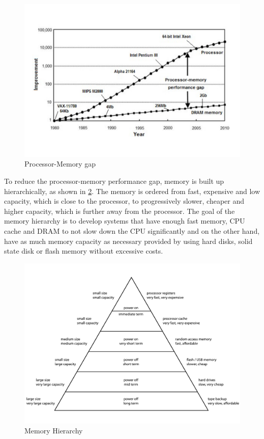 \documentclass[
	12pt,
	a4paper,
	abstract,
	bibliography=totoc,
	chapterprefix,
	headings=openright,
	numbers=endperiod,
	parskip=half,
	twoside,
]{scrreprt}
\begin{document}
\begin{figure}[ht]
	\centering
	\includegraphics[scale=0.45]{processor_memory_gap.pdf}
	\caption{Processor-Memory gap \cite{cpu-mem-gap}}
		\label{fig:processor memory gap}
\end{figure}


To reduce the processor-memory performance gap, memory is built up hierarchically, as shown in \cref{fig:memory hierarchy}.
The memory is ordered from fast, expensive and low capacity, which is close to the processor, to progressively slower, cheaper and higher capacity, which is further away from the processor.
The goal of the memory hierarchy is to develop systems that have enough fast memory, CPU cache and DRAM to not slow down the CPU significantly and on the other hand, have as much memory capacity as necessary provided by using hard disks, solid state disk or flash memory without excessive costs.

\begin{figure}[ht]
	\centering
	\includegraphics[scale=0.6]{ComputerMemoryHierarchy.pdf}
	\caption{Memory Hierarchy \cite{wikiMemoryHierarchy}}
		\label{fig:memory hierarchy}
\end{figure}
\end{document}
